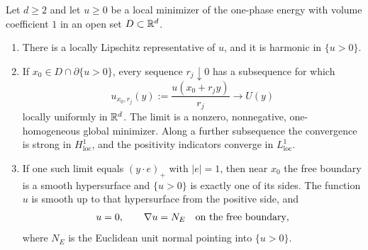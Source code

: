 \begin{proposition}\label{red:regularity}
Let $d\geq2$ and let $u\geq0$ be a local minimizer of the one-phase energy
with volume coefficient $1$ in an open set $D\subset\mathbb R^d$.
\begin{enumerate}
\renewcommand{\labelenumi}{\textup{(\roman{enumi})}}
\item There is a locally Lipschitz representative of $u$, and it is harmonic
in $\{u>0\}$.
\item If $x_0\in D\cap\partial\{u>0\}$, every sequence $r_j\downarrow0$
has a subsequence for which
\begin{equation}\label{red:blowup-sequence}
 u_{x_0,r_j}(y):=\frac{u(x_0+r_jy)}{r_j}\longrightarrow U(y)
\end{equation}
locally uniformly in $\mathbb R^d$.  The limit is a nonzero, nonnegative,
one-homogeneous global minimizer.  Along a further subsequence the convergence
is strong in $H^1_{\mathrm{loc}}$, and the positivity indicators converge in
$L^1_{\mathrm{loc}}$.
\item If one such limit equals $(y\cdot e)_+$ with $|e|=1$, then near
$x_0$ the free boundary is a smooth hypersurface and $\{u>0\}$ is exactly
one of its sides.  The function $u$ is smooth up to that hypersurface from
the positive side, and
\begin{equation}\label{red:bernoulli}
 u=0,\qquad \nabla u=N_E
 \quad\hbox{on the free boundary},
\end{equation}
where $N_E$ is the Euclidean unit normal pointing into $\{u>0\}$.
\end{enumerate}
\end{proposition}

